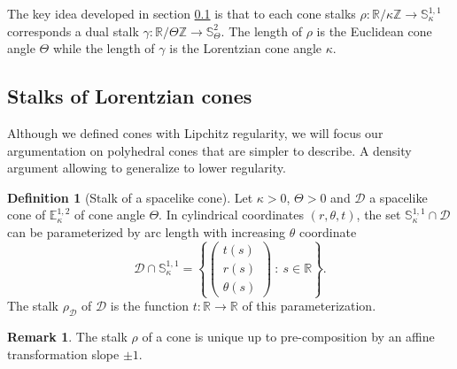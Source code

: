 \documentclass[a4paper,12pt]{article}
\def\ZZ{\mathbb{Z}}
\def\RR{\mathbb{R}}
\newcommand{\mass}[1]{{\mathbb E}^{1,2}_{#1}}
\def\SS{\mathbb{S}}
\def\Cone{\mathcal D}
\theoremstyle{definition}
\newtheorem{defi}[lem]{Definition}	%
\newtheorem*{rem}{Remark}			 %
\begin{document}
					The key idea developed in section \ref{sec:stalks} is that to each cone stalks $\rho : \RR/\kappa\ZZ \rightarrow \SS^{1,1}_\kappa$ corresponds a dual stalk $\gamma : \RR/\Theta\ZZ \rightarrow \SS^2_\Theta$. The length of $\rho$ is the Euclidean cone angle $\Theta$ while the length of $\gamma$ is the Lorentzian cone angle $\kappa$.
				
				\subsection{Stalks of Lorentzian cones} \label{sec:stalks}
					Although we defined cones with Lipchitz regularity, we will focus our argumentation on polyhedral cones that are simpler to describe. A density argument allowing to generalize to lower regularity.
					
					\begin{defi}[Stalk of a spacelike cone]\label{def:stalk_spacelike_cone}
					Let $\kappa>0$, $\Theta>0$ and $\Cone$ a spacelike cone of $\mass{\kappa}$ of cone angle $\Theta$.
					In cylindrical coordinates $(r,\theta, t)$, the set $\SS^{1,1}_\kappa\cap \Cone$ can be parameterized by arc length with increasing $\theta$ coordinate
					$$\Cone\cap \SS^{1,1}_\kappa= \left\{ \left(\begin{array}{c}
						t(s)\\
						r(s)\\
						\theta(s)
					\end{array}\right) ~:~ s\in \RR\right\}.
					$$
					The stalk $\rho_{\Cone}$ of $\Cone$ is the function $ t: \RR\rightarrow \RR$ of this parameterization.
					\end{defi}
					\begin{rem}\label{rem:stalk_cone_unique_up}
					 The stalk $\rho$ of a cone is unique up to pre-composition by an affine transformation slope $\pm1$.
					\end{rem}
\end{document}
